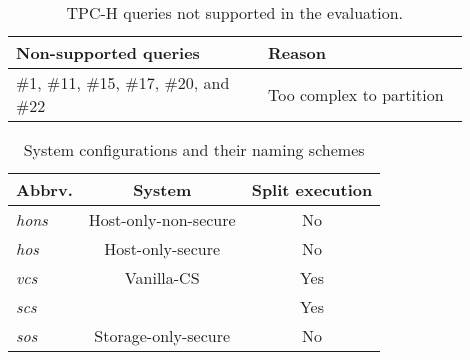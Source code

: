 
\begin{table}[h]
    \centering
\begin{tabular}{p{0.5\linewidth}p{0.4\linewidth}}
\toprule
{\bf  Non-supported queries} & {\bf Reason} \\
\midrule
\#1, \#11, \#15, \#17, \#20, and \#22 & Too complex to partition\\
\bottomrule
\end{tabular}

\caption{TPC-H queries not supported in the evaluation. \label{tab:ign-query}}
\end{table}

\fi 

\begin{table}[t]
	{\small
    \centering
\begin{tabular}{lcc}
\toprule
{\bf Abbrv.} & {\bf  System} & {\bf Split execution} \\
\midrule
%
\emph{hons} & Host-only-non-secure &  No\\ 
\emph{hos} & Host-only-secure & No\\
\emph{vcs} & Vanilla-CS & Yes\\
\emph{scs} & \project{} & Yes\\
\emph{sos} & Storage-only-secure & No\\
\bottomrule
\end{tabular}
}
\caption{\small System configurations and their naming schemes \label{tab:sys-names}}
\vspace{-3mm}
\end{table}

